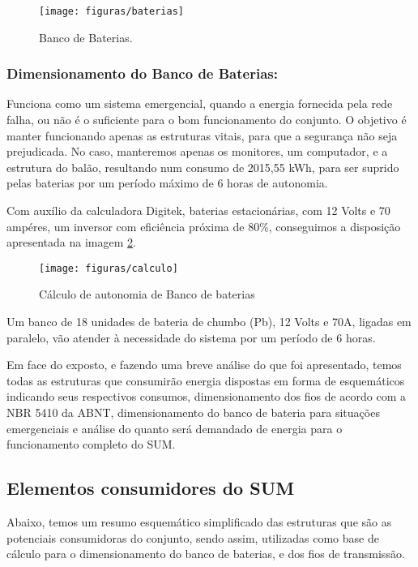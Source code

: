 \begin{figure}[H]
	\centering
	\caption{Banco de Baterias.}
	\texttt{[image: figuras/baterias]}
	\label{img:baterias}
\end{figure}

\subsubsection{Dimensionamento do Banco de Baterias:}

Funciona como um sistema emergencial, quando a energia fornecida pela rede falha, ou não é o suficiente para o bom funcionamento do conjunto. O objetivo é manter funcionando apenas as estruturas vitais, para que a segurança não seja prejudicada. No caso, manteremos apenas os monitores, um computador, e a estrutura do balão, resultando num consumo de 2015,55 kWh, para ser suprido pelas baterias por um período máximo de 6 horas de autonomia.

Com auxílio da calculadora Digitek, baterias estacionárias, com 12 Volts e 70 ampéres, um inversor com eficiência próxima de 80\%, conseguimos a disposição apresentada na imagem \ref{img:calculo}.

\begin{figure}[H]
	\centering
	\caption[Cálculo de autonomia de Banco de baterias]{Cálculo de autonomia de Banco de baterias~\cite{digitek}}
	\texttt{[image: figuras/calculo]}
	\label{img:calculo}
\end{figure}


Um banco de 18 unidades de bateria de chumbo (Pb), 12 Volts e 70A, ligadas em paralelo, vão atender à necessidade do sistema por um período de 6 horas.

Em face do exposto, e fazendo uma breve análise do que foi apresentado, temos todas as estruturas que consumirão energia dispostas em forma de esquemáticos indicando seus respectivos consumos, dimensionamento dos fios de acordo com a NBR 5410 da ABNT, dimensionamento do banco de bateria para situações emergenciais e análise do quanto será demandado de energia para o funcionamento completo do SUM.

\subsection{Elementos consumidores do SUM}

Abaixo, temos um resumo esquemático simplificado das estruturas que são as potenciais consumidoras do conjunto, sendo assim, utilizadas como base de cálculo para o dimensionamento do banco de baterias, e dos fios de transmissão.

